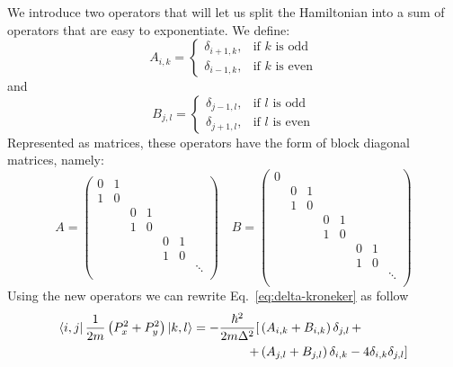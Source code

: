We introduce two operators that will let us split the Hamiltonian into a sum of operators that are easy to exponentiate. We define:
\begin{equation} \label{eq:A-form}
A_{i,k} = \begin{cases} \delta_{i+1,k}, & \mbox{if } k\mbox{ is odd} \\ \delta_{i-1,k}, & \mbox{if } k\mbox{ is even} \end{cases}
\end{equation}
and
\begin{equation} \label{eq:B-form}
B_{j,l} = \begin{cases} \delta_{j-1,l}, & \mbox{if } l\mbox{ is odd} \\ \delta_{j+1,l}, & \mbox{if } l\mbox{ is even} \end{cases}
\end{equation}
Represented as matrices, these operators have the form of block diagonal matrices, namely:
\begin{equation}
A = \begin{pmatrix}
0 & 1 \\
1 & 0 \\
 & & 0 & 1 \\
 & & 1 & 0 \\
 & & & & 0 & 1 \\
 & & & & 1 & 0 \\
 & & & &  & & \ddots \\
\end{pmatrix}
\quad B = \begin{pmatrix}
0 \\
& 0 & 1 \\
& 1 & 0 \\
& & & 0 & 1 \\
& & & 1 & 0 \\
& & & & & 0 & 1 \\
& & & & & 1 & 0 \\
& & & & &  & & \ddots \\
\end{pmatrix}
\end{equation}
Using the new operators we can rewrite Eq.~\eqref{eq:delta-kroneker} as follow
\begin{align}
\bra{i,j} \frac{1}{2m} \left( P_x^2 + P_y^2 \right) \ket{k,l} = -\frac{\hbar^2}{2m\Delta^2}  [ & \left( A_{i,k} + B_{i,k} \right) \delta_{j,l} \, + \\ + & \left( A_{j,l} + B_{j,l} \right) \delta_{i,k} - 4 \delta_{i,k} \delta_{j,l} ] \nonumber
\end{align}
